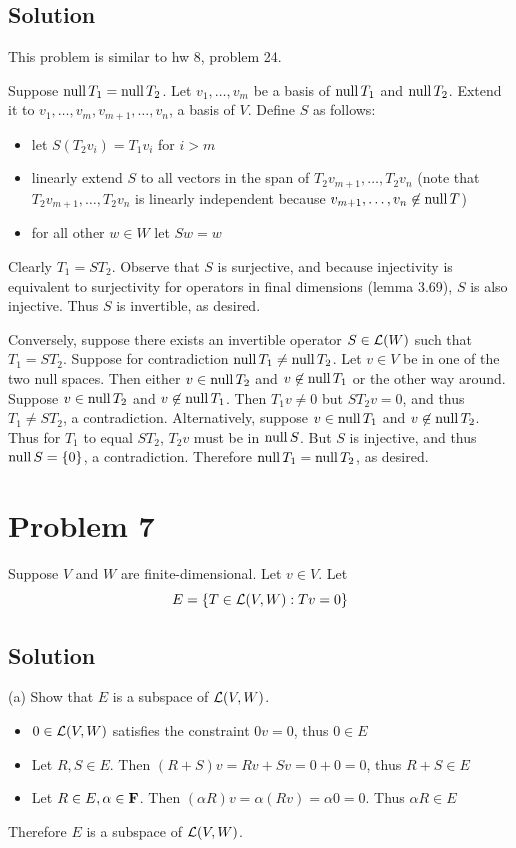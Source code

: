 \documentclass{article}
\begin{document}
\subsection*{Solution}
This problem is similar to hw 8, problem 24.

\vs

Suppose $\text{null}\, T_1=\text{null}\, T_2$. Let $v_1,\ldots,v_m$ be a basis of $\text{null}\, T_1$ and $\text{null}\, T_2$. Extend it to $v_1,\ldots,v_m,v_{m+1},\ldots,v_n$, a basis of $V$. Define $S$ as follows:
\begin{itemize}
    \item let $S(T_2v_i)=T_1v_i$ for $i>m$
    \item linearly extend $S$ to all vectors in the span of $T_2v_{m+1},\ldots,T_2v_n$ (note that $T_2v_{m+1},\ldots,T_2v_n$ is linearly independent because $v_{m+1},\ldots,v_n\not\in\text{null}\, T$)
    \item for all other $w\in W$ let $Sw=w$
\end{itemize}

Clearly $ T_1=ST_2$. Observe that $S$ is surjective, and because injectivity is equivalent to surjectivity for operators in final dimensions (lemma 3.69), $S$ is also injective. Thus $S$ is invertible, as desired.

\vs

Conversely, suppose there exists an invertible operator $S\in\Lo(W)$ such that $T_1=ST_2$. Suppose for contradiction $\text{null}\, T_1\neq \text{null}\, T_2$. Let $v\in V$ be in one of the two null spaces. Then either $v\in\text{null}\, T_2$ and $v\not\in\text{null}\, T_1$ or the other way around. Suppose $v\in\text{null}\, T_2$ and $v\not\in\text{null}\, T_1$. Then $T_1v\neq 0$ but $ST_2v=0$, and thus $T_1\neq ST_2$, a contradiction. Alternatively, suppose $v\in\text{null}\, T_1$ and $v\not\in\text{null}\, T_2$. Thus for $T_1$ to equal $ST_2$, $T_2v$ must be in $\text{null}\, S$. But $S$ is injective, and thus $\text{null}\, S=\{0\}$, a contradiction. Therefore $\text{null}\, T_1=\text{null}\, T_2$, as desired.

\section*{Problem 7}
Suppose $V$ and $W$ are finite-dimensional. Let $v\in V$. Let
\[E=\{T\in\L(V,W):Tv=0\}\]

\subsection*{Solution}
(a) Show that $E$ is a subspace of $\L(V,W)$.
\begin{itemize}
    \item $0\in\L(V,W)$ satisfies the constraint $0v=0$, thus $0\in E$
    \item Let $R, S\in E$. Then $(R+S)v=Rv+Sv=0+0=0$, thus $R+S\in E$
    \item Let $R\in E,\alpha\in\mathbf{F}$. Then $(\alpha R)v=\alpha(Rv)=\alpha 0=0$. Thus $\alpha R\in E$
\end{itemize}
Therefore $E$ is a subspace of $\L(V,W)$.
\end{document}
